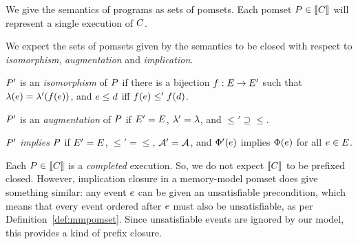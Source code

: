 We give the semantics of programs as sets of pomsets.  Each pomset
$P\in\llbracket C\rrbracket$ will represent a single execution of $C$.

We expect the sets of pomsets given by the semantics to be closed with
respect to \emph{isomorphism}, \emph{augmentation} and \emph{implication}.
\begin{definition}
  $P'$ is an \emph{isomorphism} of $P$ if there is a bijection
  $f:E\mathbin\rightarrow E'$ such that $\lambda(e)=\lambda'(f(e))$, and
  $e\le d$ iff $f(e)\le'f(d)$. %

  $P'$ is an \emph{augmentation} of $P$ if $E'=E$,
  ${\lambda'}={\lambda}$, and ${\le'}\supseteq{\le}$. %

  $P'$ \emph{implies} $P$ if $E'=E$, ${\le'}={\le}$,
  $\mathcal{A}'=\mathcal{A}$, and $\Phi'(e)$
  implies $\Phi(e)$ for all $e\in E$.
\end{definition}
Each
$P\in\llbracket C\rrbracket$ is a \emph{completed} execution.  So, we do not expect $\llbracket C\rrbracket$ to be prefixed closed.  However, implication
closure in a memory-model pomset does give something similar: any event
$e$ can be given an unsatisfiable precondition, which means that every
event ordered after $e$ must also be unsatisfiable, as per
Definition~\ref{def:mmpomset}.  Since unsatisfiable events are ignored by our model, this
provides a kind of prefix closure.



